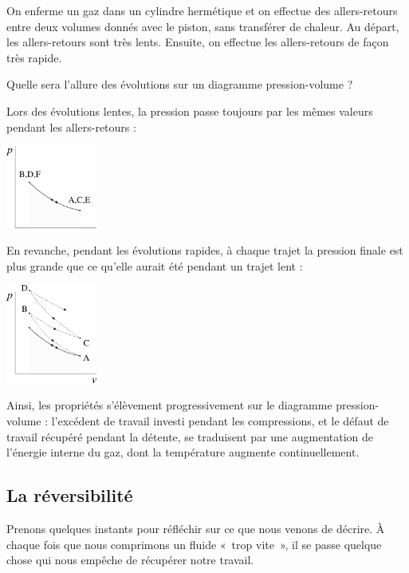 			
			\begin{anexample}
				On enferme un gaz dans un cylindre hermétique et on effectue des allers-retours entre deux volumes donnés avec le piston, sans transférer de chaleur. Au départ, les allers-retours sont très lents. Ensuite, on effectue les allers-retours de façon très rapide.
				
				Quelle sera l’allure des évolutions sur un diagramme pression-volume ?
					\begin{answer}
						Lors des évolutions lentes, la pression passe toujours par les mêmes valeurs pendant les allers-retours :
							\begin{center}
								\includegraphics[width=3cm]{images/exe_pv_rev.png}
							\end{center}
						En revanche, pendant les évolutions rapides, à chaque trajet la pression finale est plus grande que ce qu’elle aurait été pendant un trajet lent :
							\begin{center}
								\includegraphics[width=3cm]{images/exe_pv_irr.png}
							\end{center}
						Ainsi, les propriétés s’élèvement progressivement sur le diagramme pression-volume : l’excédent de travail investi pendant les compressions, et le défaut de travail récupéré pendant la détente, se traduisent par une augmentation de l’énergie interne du gaz, dont la température augmente continuellement.
					\end{answer}
			\end{anexample}


	\subsection{La réversibilité}
	\label{ch_reversibilite}
	
		Prenons quelques instants pour réfléchir sur ce que nous venons de décrire. À chaque fois que nous comprimons un fluide «~trop vite~», il se passe quelque chose qui nous empêche de récupérer notre travail.
		
